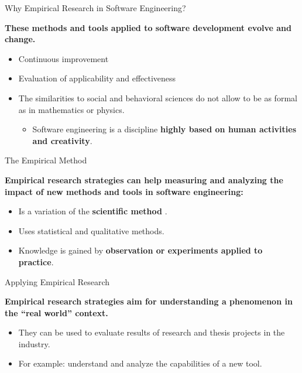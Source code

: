 \documentclass[10pt]{beamer}
\begin{document}
\begin{frame}{Why Empirical Research in Software Engineering?}
	
	\textbf{These methods and tools applied to software development evolve and change.}	
	
	\begin{itemize}
		\item Continuous improvement
		\item Evaluation of applicability and effectiveness
		\item The similarities to social and behavioral sciences do not allow to be as formal as in mathematics or physics.
		\begin{itemize}
			\item Software engineering is a discipline \textbf{highly based on human activities and creativity}.
		\end{itemize}
	\end{itemize}

\end{frame}

\begin{frame}{The Empirical Method}
	
	\textbf{Empirical research strategies can help measuring and analyzing the impact of new methods and tools in software engineering:}	

	\bigskip		
	\begin{itemize}
		\item Is a variation of the \textbf{scientific method} \cite{10-1007-3-540-57092-6-91,Glass:1994:SC:624604.625401}.
		\item Uses statistical and qualitative methods.
		\item Knowledge is gained by \textbf{observation or experiments applied to practice}.
	\end{itemize}

\end{frame}

\begin{frame}{Applying Empirical Research}
	
	\textbf{Empirical research strategies aim for understanding a phenomenon in the ``real world'' context.}	

	\begin{itemize}
		\item They can be used to evaluate results of research and thesis projects in the industry.
		\item For example: understand and analyze the capabilities of a new tool.
	\end{itemize}

\end{frame}
\end{document}
